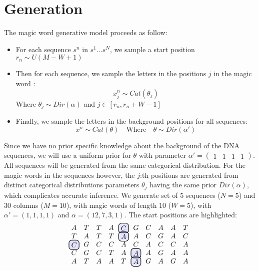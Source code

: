 \chapter{Generation} %

\label{Generation} %



The magic word generative model proceeds as follow:

\begin{itemize}
\item For each sequence $s^n$ in $s^1 \dots s^N$, we sample a start position $r_n \sim U(M-W+1)$
\item Then for each sequence, we sample the letters in the positions $j$ in the magic word : 
\begin{equation*}
x^n_j \sim Cat(\theta_j) 
\end{equation*}
Where $\theta_j \sim Dir(\alpha)$ and $j \in [r_n, r_n + W - 1]$
\item Finally, we sample the letters in the background positions for all sequences:
\begin{equation*}
x^n \sim Cat(\theta) \quad \text{Where} \quad \theta \sim Dir(\alpha')
\end{equation*}
\end{itemize}
Since we have no prior specific knowledge about the background of the DNA sequences, we will use a uniform prior for $\theta$ with parameter $\alpha' = \begin{pmatrix}
1&1&1&1
\end{pmatrix}$. All sequences will be generated from the same categorical distribution. For the magic words in the sequences however, the $j$:th positions are generated from distinct categorical distributions parameters $\theta_j$ having the same prior $Dir(\alpha)$, which complicates accurate inference. 
We generate set of 5 sequences ($N=5$) and 30 columns ($M=10$), with magic words of length 10 ($W= 5 $), with $\alpha' = (1, 1,1,1)$ and $\alpha = (12,7,3,1)$. The start positions are highlighted:
\begin{equation*}
\begin{matrix}
A & T & T & A & \hlight{C} & G & C & A & A & T \\
T & A & T & T & \hlight{A} & A & C & G & A & C \\
\hlight{C} & G & C & C & A & C & A & C & C & A \\
C & G & C & T & A & \hlight{A} & A & G & A & A \\
A & T & A & A & T & \hlight{A} & G & A & G & A 
\end{matrix}
\end{equation*}